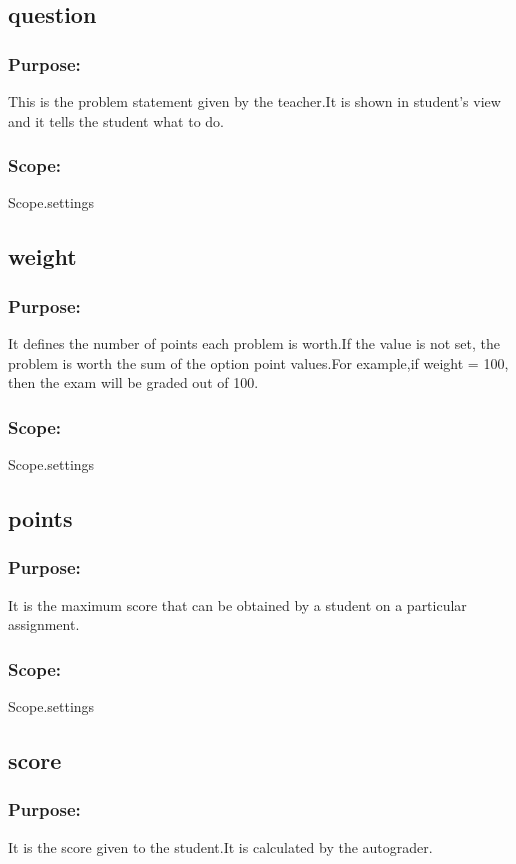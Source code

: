 \documentclass{scrreprt}
\begin{document}
\subsection{question}
\subsubsection{Purpose:}
This is the problem statement given by the teacher.It is shown in student's view and it tells the student what to do.
\subsubsection{Scope:}
Scope.settings

\subsection{weight}
\subsubsection{Purpose:}
It defines the number of points each problem is worth.If the value is not set, the problem is worth the sum of the
        option point values.For example,if weight = 100, then the exam will be graded out of 100.
\subsubsection{Scope:}
Scope.settings

\subsection{points}
\subsubsection{Purpose:}
It is the maximum score that can be obtained by a student on a particular assignment.
\subsubsection{Scope:}
Scope.settings

\subsection{score}
\subsubsection{Purpose:}
It is the score given to the student.It is calculated by the autograder.
\end{document}

